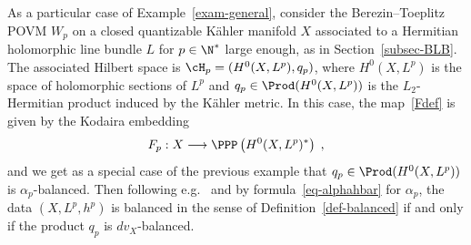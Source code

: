 \begin{exam}\label{exam-cloudK}
As a particular case of Example~\ref{exam-general}, consider the Berezin--Toeplitz POVM $W_p$ on a closed quantizable K\"ahler manifold $X$ associated to a Hermitian holomorphic line bundle $L$ for $p\in\N^*$ large enough, as in Section~\ref{subsec-BLB}. The associated Hilbert space is $\cH_p=(H^0(X,L^p),q_p)$, where $H^0(X,L^p)$ is the space of holomorphic sections of $L^p$ and $q_p\in\Prod(H^0(X,L^p))$ is the $L_2$-Hermitian product induced by the K\"ahler metric. In this case, the map~\eqref{Fdef} is given by the Kodaira embedding
\begin{equation}\label{Kodemb}
F_p: X \longrightarrow \PPP\left(H^0(X,L^p)^*\right)\;,
\end{equation}
and we get as a special case of the previous example that $q_p\in\Prod(H^0(X,L^p))$ is $\alpha_p$-balanced. Then following e.g.~\cite[Proposition~8.3]{Fine-lectures} and by formula~\eqref{eq-alphahbar} for $\alpha_p$, the data $(X,L^p,h^p)$ is balanced in the sense of Definition~\ref{def-balanced} if and only if the product $q_p$ is $dv_X$-balanced.
\end{exam}

